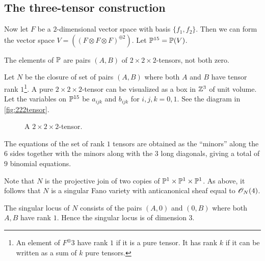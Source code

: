 
\subsection{The three-tensor construction}

Now let $F$ be a $2$-dimensional vector space with basis $\{f_1,f_2\}$. Then we can form the vector space $V = ((F \otimes F \otimes F)^{\oplus 2})$. Let $\P^{15}=\P(V)$.

The elements of $\P$ are pairs $(A,B)$ of $2 \times 2 \times 2$-tensors, not both zero. 

Let $N$ be the closure of set of pairs $(A,B)$ where both $A$ and $B$ have tensor rank $1$\footnote{An element of $F^\otimes 3$ have rank $1$ if it is a pure tensor. It has rank $k$ if it can be written as a sum of $k$ pure tensors.}. A pure $2 \times 2 \times 2$-tensor can be visualized as a box in $\Z^3$ of unit volume. Let the variables on $\P^{15}$ be $a_{ijk}$ and $b_{ijk}$ for $i,j,k=0,1$. See the diagram in \vref{fig:222tensor}.

\begin{figure}[t]
\centering
{}
\caption{A $2 \times 2 \times 2$-tensor.}
\label{fig:222tensor}
\end{figure}

The equations of the set of rank $1$ tensors are obtained as the ``minors'' along the $6$ sides together with the minors along with the $3$ long diagonals, giving a total of $9$ binomial equations. 

Note that $N$ is the projective join of two copies of $\P^1 \times \P^1 \times \P^1$. As above, it follows that $N$ is a singular Fano variety with anticanonical sheaf equal to $\OO_N(4)$. 

The singular locus of $N$ consists of the pairs $(A,0)$ and $(0,B)$ where both $A,B$ have rank $1$. Hence the singular locus is of dimension $3$.

